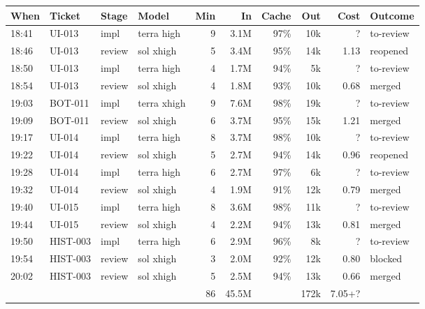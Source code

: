 \documentclass[11pt,a4paper]{article}
\begin{document}
{\small
\begin{tabularx}{\linewidth}{@{}llllrrrrrX@{}}
\toprule
When & Ticket & Stage & Model & Min & In & Cache & Out & Cost & Outcome \\
\midrule
18:41 & UI-013 & impl & terra high & 9 & 3.1M & 97\% & 10k & ? & to-review \\
18:46 & UI-013 & review & sol xhigh & 5 & 3.4M & 95\% & 14k & 1.13 & reopened \\
18:50 & UI-013 & impl & terra high & 4 & 1.7M & 94\% & 5k & ? & to-review \\
18:54 & UI-013 & review & sol xhigh & 4 & 1.8M & 93\% & 10k & 0.68 & merged \\
19:03 & BOT-011 & impl & terra xhigh & 9 & 7.6M & 98\% & 19k & ? & to-review \\
19:09 & BOT-011 & review & sol xhigh & 6 & 3.7M & 95\% & 15k & 1.21 & merged \\
19:17 & UI-014 & impl & terra high & 8 & 3.7M & 98\% & 10k & ? & to-review \\
19:22 & UI-014 & review & sol xhigh & 5 & 2.7M & 94\% & 14k & 0.96 & reopened \\
19:28 & UI-014 & impl & terra high & 6 & 2.7M & 97\% & 6k & ? & to-review \\
19:32 & UI-014 & review & sol xhigh & 4 & 1.9M & 91\% & 12k & 0.79 & merged \\
19:40 & UI-015 & impl & terra high & 8 & 3.6M & 98\% & 11k & ? & to-review \\
19:44 & UI-015 & review & sol xhigh & 4 & 2.2M & 94\% & 13k & 0.81 & merged \\
19:50 & HIST-003 & impl & terra high & 6 & 2.9M & 96\% & 8k & ? & to-review \\
19:54 & HIST-003 & review & sol xhigh & 3 & 2.0M & 92\% & 12k & 0.80 & blocked \\
20:02 & HIST-003 & review & sol xhigh & 5 & 2.5M & 94\% & 13k & 0.66 & merged \\
\midrule
 & & & & 86 & 45.5M & & 172k & 7.05+? & \\
\bottomrule
\end{tabularx}
}

\begin{center}
\end{center}
\end{document}
